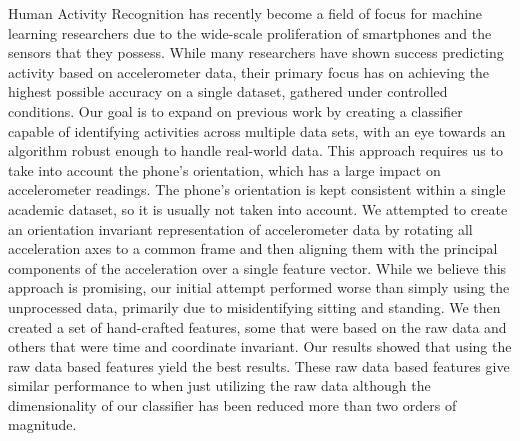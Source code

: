  Human Activity Recognition has recently become a field of focus for machine learning researchers due to the wide-scale proliferation of smartphones and the sensors that they possess. While many researchers have shown success predicting activity based on accelerometer data, their primary focus has on achieving the highest possible accuracy on a single dataset, gathered under controlled conditions. Our goal is to expand on previous work by creating a classifier capable of identifying activities across multiple data sets, with an eye towards an algorithm robust enough to handle real-world data. This approach requires us to take into account the phone's orientation, which has a large impact on accelerometer readings. The phone's orientation is kept consistent within a single academic dataset, so it is usually not taken into account. We attempted to create an orientation invariant representation of accelerometer data by rotating all acceleration axes to a common frame and then aligning them with the principal components of the acceleration over a single feature vector. While we believe this approach is promising, our initial attempt performed worse than simply using the unprocessed data, primarily due to misidentifying sitting and standing. We then created a set of hand-crafted features, some that were based on the raw data and others that were time and coordinate invariant. Our results showed that using the raw data based features yield the best results. These raw data based features give similar performance to when just utilizing the raw data although the dimensionality of our classifier has been reduced more than two orders of magnitude.
